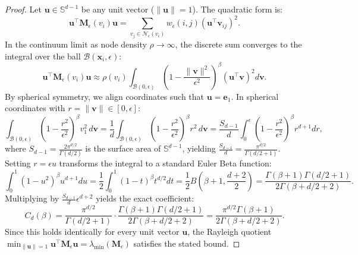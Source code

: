 \documentclass[11pt,a4paper]{article}
\theoremstyle{definition}
\begin{document}
\begin{proof}
Let $\mathbf{u} \in \mathbb{S}^{d-1}$ be any unit vector ($\|\mathbf{u}\| = 1$). The quadratic form is:
\begin{equation}
\mathbf{u}^\top \mathbf{M}_\epsilon(v_i) \mathbf{u} = \sum_{v_j \in \mathcal{N}_\epsilon(v_i)} w_\epsilon(i, j) \left( \mathbf{u}^\top \mathbf{v}_{ij} \right)^2.
\end{equation}
In the continuum limit as node density $\rho \to \infty$, the discrete sum converges to the integral over the ball $\mathcal{B}(\mathbf{x}_i, \epsilon)$:
\begin{equation}
\mathbf{u}^\top \mathbf{M}_\epsilon(v_i) \mathbf{u} \approx \rho(v_i) \int_{\mathcal{B}(0, \epsilon)} \left(1 - \frac{\|\mathbf{v}\|^2}{\epsilon^2}\right)^\beta (\mathbf{u}^\top \mathbf{v})^2 d\mathbf{v}.
\end{equation}
By spherical symmetry, we align coordinates such that $\mathbf{u} = \mathbf{e}_1$. In spherical coordinates with $r = \|\mathbf{v}\| \in [0, \epsilon]$:
\begin{equation}
\int_{\mathcal{B}(0, \epsilon)} \left(1 - \frac{r^2}{\epsilon^2}\right)^\beta v_1^2 \, d\mathbf{v} = \frac{1}{d} \int_{\mathcal{B}(0, \epsilon)} \left(1 - \frac{r^2}{\epsilon^2}\right)^\beta r^2 \, d\mathbf{v} = \frac{S_{d-1}}{d} \int_0^\epsilon \left(1 - \frac{r^2}{\epsilon^2}\right)^\beta r^{d+1} dr,
\end{equation}
where $S_{d-1} = \frac{2\pi^{d/2}}{\Gamma(d/2)}$ is the surface area of $\mathbb{S}^{d-1}$, yielding $\frac{S_{d-1}}{d} = \frac{\pi^{d/2}}{\Gamma(d/2 + 1)}$. Setting $r = \epsilon u$ transforms the integral to a standard Euler Beta function:
\begin{equation}
\int_0^1 (1 - u^2)^\beta u^{d+1} du = \frac{1}{2} \int_0^1 (1 - t)^\beta t^{d/2} dt = \frac{1}{2} B\left(\beta + 1, \frac{d+2}{2}\right) = \frac{\Gamma(\beta + 1)\Gamma(d/2 + 1)}{2 \Gamma(\beta + d/2 + 2)}.
\end{equation}
Multiplying by $\frac{S_{d-1}}{d} \epsilon^{d+2}$ yields the exact coefficient:
\begin{equation}
C_d(\beta) = \frac{\pi^{d/2}}{\Gamma(d/2 + 1)} \cdot \frac{\Gamma(\beta + 1)\Gamma(d/2 + 1)}{2 \Gamma(\beta + d/2 + 2)} = \frac{\pi^{d/2} \Gamma(\beta + 1)}{2 \Gamma(\beta + d/2 + 2)}.
\end{equation}
Since this holds identically for every unit vector $\mathbf{u}$, the Rayleigh quotient $\min_{\|\mathbf{u}\|=1} \mathbf{u}^\top \mathbf{M}_\epsilon \mathbf{u} = \lambda_{\min}(\mathbf{M}_\epsilon)$ satisfies the stated bound.
\end{proof}
\end{document}

